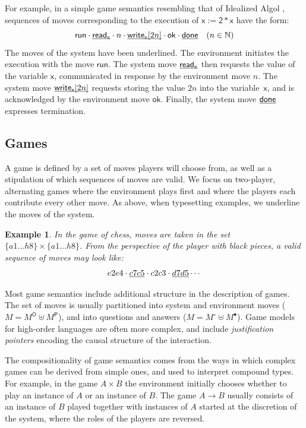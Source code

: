 \documentclass[11pt,oneside,draft]{book}
\newtheorem{example}[theorem]{Example}
\theoremstyle{definition}
\newcommand{\kw}[1]{\ensuremath{ \mathsf{#1} }}
\newcommand{\que}{\circ}         %
\newcommand{\ans}{\bullet}       %
\newcommand{\ul}[1]{%
  \underline{\smash{#1}}
}
\begin{document}
For example,
in a simple game semantics resembling that of
Idealized Algol \citep{gsia},
sequences of moves corresponding to
the execution of $\kw{x := 2 * x}$
have the form:
\[
    \kw{run} \cdot
    \ul{\kw{read}_\kw{x}} \cdot n \cdot
    \ul{\kw{write}_\kw{x}[2n]} \cdot \kw{ok} \cdot
    \ul{\kw{done}} \quad (n \in \mathbb{N})
\]
The moves of the system have been underlined.
The environment initiates the execution with
the move $\kw{run}$.
The system move $\ul{\kw{read}_\kw{x}}$ then requests
the value of the variable $\kw{x}$,
communicated in response by the environment move $n$.
The system move $\ul{\kw{write}_\kw{x}[2n]}$ requests
storing the value $2n$ into the variable~$\kw{x}$,
and is acknowledged by the environment move $\kw{ok}$.
Finally, the system move $\ul{\kw{done}}$
expresses termination.


\subsection{Games} \label{sec:mainideas:gs:games} %

A game is defined by a set of moves
players will choose from,
as well as a stipulation of which
sequences of moves are valid.
We focus on two-player, alternating games
where the environment plays first and
where the players
each contribute every other move.
As above, when typesetting examples,
we underline the moves of the system.

\begin{example}
In the game of chess,
moves are taken in the set $\{a1 \ldots h8\} \times \{a1 \ldots h8\}$.
From the perspective of the player
with black pieces,
a valid sequence of moves may look like:
\[ e2e4 \cdot \ul{c7c5} \cdot c2c3 \cdot \ul{d7d5} \cdots \]
\end{example}


Most game semantics
include additional structure
in the description of games.
The set of moves is usually partitioned
into system and environment moves ($M = M^\kw{O} \uplus M^\kw{P}$),
and into questions and answers ($M = M^\que \uplus M^\ans$).
Game models for high-order languages are often more complex,
and include \emph{justification pointers}
encoding the causal structure of the interaction.

The compositionality of game semantics
comes from the ways in which complex games can be derived from simple ones,
and used to interpret compound types.
For example,
in the game $A \times B$
the environment initially chooses whether to play
an instance of $A$ or an instance of $B$.
The game $A \rightarrow B$ usually consists of
an instance of $B$ played
together with instances of $A$
started at the discretion of the system,
where the roles of the players are reversed.
\end{document}
